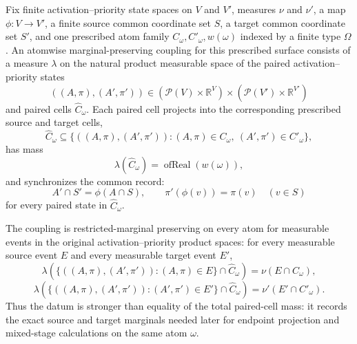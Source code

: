 \begin{definition}
Fix finite activation--priority state spaces on \(V\) and \(V'\), measures
\(\nu\) and \(\nu'\), a map \(\phi:V\to V'\), a finite source common
coordinate set \(S\), a target common coordinate set \(S'\), and one
prescribed atom family \(C_\omega,C'_\omega,w(\omega)\) indexed by a finite
type \(\Omega\).
An atomwise marginal-preserving coupling for this prescribed surface consists
of a measure \(\lambda\) on the natural product measurable space of the paired
activation--priority states
\[
  ((A,\pi),(A',\pi'))\in
  (\mathcal P(V)\times\mathbb R^V)\times
  (\mathcal P(V')\times\mathbb R^{V'})
\]
and paired cells \(\widehat C_\omega\).  Each paired cell projects into the
corresponding prescribed source and target cells,
\[
  \widehat C_\omega\subseteq
  \{((A,\pi),(A',\pi')):(A,\pi)\in C_\omega,\ (A',\pi')\in C'_\omega\},
\]
has mass
\[
  \lambda(\widehat C_\omega)=\operatorname{ofReal}(w(\omega)),
\]
and synchronizes the common record:
\[
  A'\cap S'=\phi(A\cap S),\qquad
  \pi'(\phi(v))=\pi(v)\quad(v\in S)
\]
for every paired state in \(\widehat C_\omega\).

The coupling is restricted-marginal preserving on every atom for measurable
events in the original activation--priority product spaces: for every
measurable source event \(E\) and every measurable target event \(E'\),
\[
  \lambda(\{((A,\pi),(A',\pi')):(A,\pi)\in E\}\cap\widehat C_\omega)
    =\nu(E\cap C_\omega),
\]
\[
  \lambda(\{((A,\pi),(A',\pi')):(A',\pi')\in E'\}\cap\widehat C_\omega)
    =\nu'(E'\cap C'_\omega).
\]
Thus the datum is stronger than equality of the total paired-cell mass: it
records the exact source and target marginals needed later for endpoint
projection and mixed-stage calculations on the same atom \(\omega\).
\end{definition}
